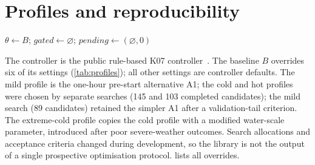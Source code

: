 \section{Profiles and reproducibility}\label{app:profiles}
\begin{algorithm}[!htbp]
\caption{Supervisory profile reassignment (one episode)}\label{alg:supervisor}
\small
{}
$\theta \leftarrow B$; \quad $\textit{gated} \leftarrow \varnothing$; \quad $\textit{pending} \leftarrow (\varnothing, 0)$\;
\end{algorithm}
The controller is the public rule-based K07 controller~\cite{malyshev2026k07}. The baseline $B$ overrides
six of its settings (\cref{tab:profiles}); all other settings are controller defaults. The mild profile is the one-hour pre-start
alternative A1; the cold and hot profiles were chosen by separate searches (145 and 103 completed candidates); the mild
search (89 candidates) retained the simpler A1 after a validation-tail criterion.
The extreme-cold profile copies the cold profile with a modified water-scale parameter, introduced after poor
severe-weather outcomes.
Search allocations and acceptance
criteria changed during development, so the library is not the output of a single prospective optimisation protocol.
 lists all overrides.

